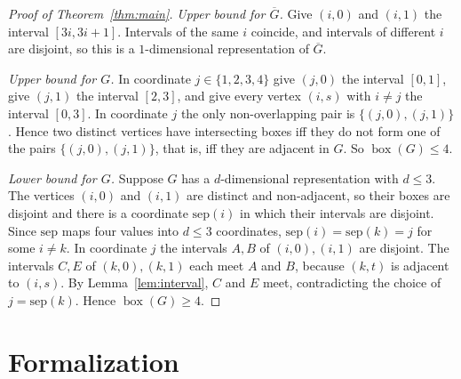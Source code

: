 \documentclass[11pt]{article}
\theoremstyle{plain}
\theoremstyle{definition}
\theoremstyle{remark}
\newcommand{\bx}{\operatorname{box}}
\begin{document}
\begin{proof}[Proof of Theorem~\ref{thm:main}]
\emph{Upper bound for $\overline G$.} Give $(i,0)$ and $(i,1)$ the interval
$[3i,3i+1]$. Intervals of the same $i$ coincide, and intervals of different $i$ are
disjoint, so this is a $1$-dimensional representation of $\overline G$.

\emph{Upper bound for $G$.} In coordinate $j\in\{1,2,3,4\}$ give $(j,0)$ the interval
$[0,1]$, give $(j,1)$ the interval $[2,3]$, and give every vertex $(i,s)$ with
$i\ne j$ the interval $[0,3]$. In coordinate $j$ the only non-overlapping pair is
$\{(j,0),(j,1)\}$. Hence two distinct vertices have intersecting boxes iff they do not
form one of the pairs $\{(j,0),(j,1)\}$, that is, iff they are adjacent in $G$. So
$\bx(G)\le4$.

\emph{Lower bound for $G$.} Suppose $G$ has a $d$-dimensional representation with
$d\le3$. The vertices $(i,0)$ and $(i,1)$ are distinct and non-adjacent, so their
boxes are disjoint and there is a coordinate $\mathrm{sep}(i)$ in which their
intervals are disjoint. Since $\mathrm{sep}$ maps four values into $d\le3$
coordinates, $\mathrm{sep}(i)=\mathrm{sep}(k)=j$ for some $i\ne k$. In coordinate $j$
the intervals $A,B$ of $(i,0),(i,1)$ are disjoint. The intervals $C,E$ of
$(k,0),(k,1)$ each meet $A$ and $B$, because $(k,t)$ is adjacent to $(i,s)$. By
Lemma~\ref{lem:interval}, $C$ and $E$ meet, contradicting the choice of
$j=\mathrm{sep}(k)$. Hence $\bx(G)\ge4$.
\end{proof}

\section{Formalization}
\end{document}
